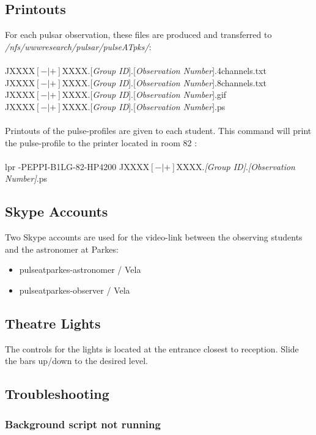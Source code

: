 \documentclass{article}
\begin{document}
\subsection*{Printouts}
For each pulsar observation, these files are produced and transferred to \emph{/nfs/wwwresearch/pulsar/pulseATpks/}: \\
\\
JXXXX$[-|+]$XXXX.[\emph{Group ID}].[\emph{Observation Number}].4channels.txt \\
JXXXX$[-|+]$XXXX.[\emph{Group ID}].[\emph{Observation Number}].8channels.txt \\
JXXXX$[-|+]$XXXX.[\emph{Group ID}].[\emph{Observation Number}].gif \\
JXXXX$[-|+]$XXXX.[\emph{Group ID}].[\emph{Observation Number}].ps \\
\\
Printouts of the pulse-profiles are given to each student. This command will print the pulse-profile to the printer located in room 82 : \\
\\
lpr -PEPPI-B1LG-82-HP4200 JXXXX$[-|+]$XXXX.\emph{[Group ID]}.\emph{[Observation Number]}.ps


\subsection*{Skype Accounts}
Two Skype accounts are used for the video-link between the observing students and the astronomer at Parkes:
\begin{itemize}
\item pulseatparkes-astronomer / Vela
\item pulseatparkes-observer / Vela
\end{itemize}

\subsection*{Theatre Lights}
The controls for the lights is located at the entrance closest to reception. Slide the bars up/down to the desired level.

\subsection*{Troubleshooting}
\subsubsection*{Background script not running}
\end{document}
